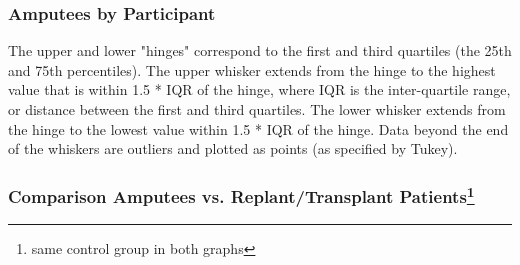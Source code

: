 \documentclass{beamer}
\begin{document}
\begin{frame}
\frametitle{Amputees by Participant}
\begin{figure}
\setlength{\fboxsep}{0pt}%
\setlength{\fboxrule}{1pt}%
\end{figure}
\tiny
The upper and lower "hinges" correspond to the first and third quartiles (the 25th and 75th percentiles). The upper whisker extends from the hinge to the highest value that is within 1.5 * IQR of the hinge, where IQR is the inter-quartile range, or distance between the first and third quartiles. The lower whisker extends from the hinge to the lowest value within 1.5 * IQR of the hinge. Data beyond the end of the whiskers are outliers and plotted as points (as specified by Tukey).
\end{frame}

\begin{frame}
\frametitle{Comparison Amputees vs. Replant/Transplant Patients\footnote{same control group in both graphs}}
\begin{figure}
\setlength{\fboxsep}{0pt}%
\setlength{\fboxrule}{1pt}%
\end{figure}
\vspace{-25pt}
\begin{figure}
\setlength{\fboxsep}{0pt}%
\setlength{\fboxrule}{1pt}%
\end{figure}
\end{frame}
\end{document}
